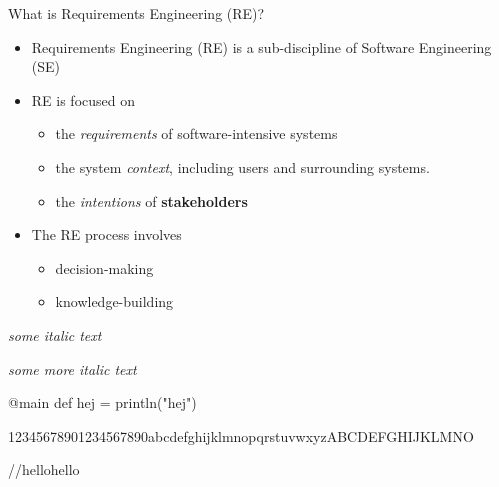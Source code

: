 
\begin{Slide}{What is Requirements Engineering (RE)?}

\begin{itemize}
\item Requirements Engineering (RE) is a sub-discipline of Software Engineering (SE) 

\item RE is focused on 

\begin{itemize}
\item the \textit{requirements} of software-intensive systems 
\item the system \textit{context}, including users and surrounding systems.
\item the \textit{intentions} of \textbf{stakeholders}

\end{itemize}
\item The RE process involves 
\begin{itemize}
\item decision-making
\item knowledge-building
 
\end{itemize}
\end{itemize}
\textit{some italic text}


\textit{some more italic text}

\begin{Code}[language=scala,basicstyle=\small\ttfamily\selectfont]
@main def hej = println("hej") 

12345678901234567890abcdefghijklmnopqrstuvwxyzABCDEFGHIJKLMNO

//hellohello
\end{Code}

\end{Slide}
